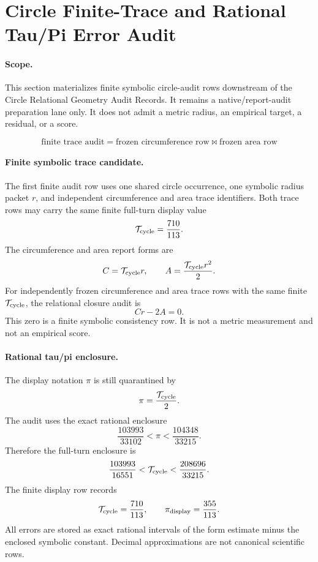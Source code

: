 \section{Circle Finite-Trace and Rational Tau/Pi Error Audit}

\paragraph{Scope.}
This section materializes finite symbolic circle-audit rows downstream of the Circle Relational Geometry Audit Records.  It remains a native/report-audit preparation lane only.  It does not admit a metric radius, an empirical target, a residual, or a score.

\[
\boxed{\text{finite trace audit}=\text{frozen circumference row}\bowtie\text{frozen area row}}
\]

\paragraph{Finite symbolic trace candidate.}
The first finite audit row uses one shared circle occurrence, one symbolic radius packet $r$, and independent circumference and area trace identifiers.  Both trace rows may carry the same finite full-turn display value
\[
\mathcal T_{\mathrm{cycle}}=\frac{710}{113}.
\]
The circumference and area report forms are
\[
C=\mathcal T_{\mathrm{cycle}}r,
\qquad
A=\frac{\mathcal T_{\mathrm{cycle}}r^2}{2}.
\]
For independently frozen circumference and area trace rows with the same finite $\mathcal T_{\mathrm{cycle}}$, the relational closure audit is
\[
\boxed{Cr-2A=0.}
\]
This zero is a finite symbolic consistency row.  It is not a metric measurement and not an empirical score.

\paragraph{Rational tau/pi enclosure.}
The display notation $\pi$ is still quarantined by
\[
\pi=\frac{\mathcal T_{\mathrm{cycle}}}{2}.
\]
The audit uses the exact rational enclosure
\[
\frac{103993}{33102}<\pi<\frac{104348}{33215}.
\]
Therefore the full-turn enclosure is
\[
\frac{103993}{16551}<\mathcal T_{\mathrm{cycle}}<\frac{208696}{33215}.
\]
The finite display row records
\[
\mathcal T_{\mathrm{cycle}}=\frac{710}{113},
\qquad
\pi_{\mathrm{display}}=\frac{355}{113}.
\]
All errors are stored as exact rational intervals of the form estimate minus the enclosed symbolic constant.  Decimal approximations are not canonical scientific rows.

